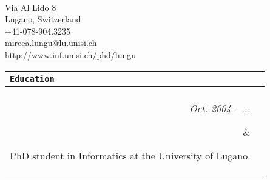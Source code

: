 \documentclass{article}
\newcommand{\cvsectionname}[1]{\multicolumn{2}{l}{\Large \tt #1}\\\hline\\}
\newenvironment{cvsection}[1]{\medskip \begin{tabular}{rl} \cvsectionname{#1}}{\end{tabular}}
\newcommand{\cvline}[2]{\parbox[t]{2.3cm}{\sl  \hfill #1} & \parbox[t]{14cm}{ #2 \hfill}\\\vspace{4pt}}
\newcommand{\cvexplanationline}[1]{ & $\triangleright$ #1 \hfill \\\vspace{4pt}}
\begin{document}
\pagestyle{empty}

\begin{center}
\hspace*{4.8cm}{\LARGE  \bf     Mircea Filip LUNGU}  \\[9pt]
\hspace*{4.8cm}Via Al Lido 8  \\
\hspace*{4.8cm}Lugano, Switzerland  \\
\hspace*{4.8cm}+41-078-904.3235  \\
\hspace*{4.8cm}mircea.lungu@lu.unisi.ch  \\
\hspace*{4.8cm}\href{http://www.inf.unisi.ch/phd/lungu}{http://www.inf.unisi.ch/phd/lungu}
\end{center}

\vspace{0.3cm}

\begin{cvsection}{Education}
\cvline{Oct. 2004 - ...} {PhD student in Informatics at the University of Lugano. 
}

\cvline{1999 - 2004} {Student at the Faculty of Informatics from ``Politehnica'' University of Timi\c{s}oara}

\end{cvsection}
\end{document}
